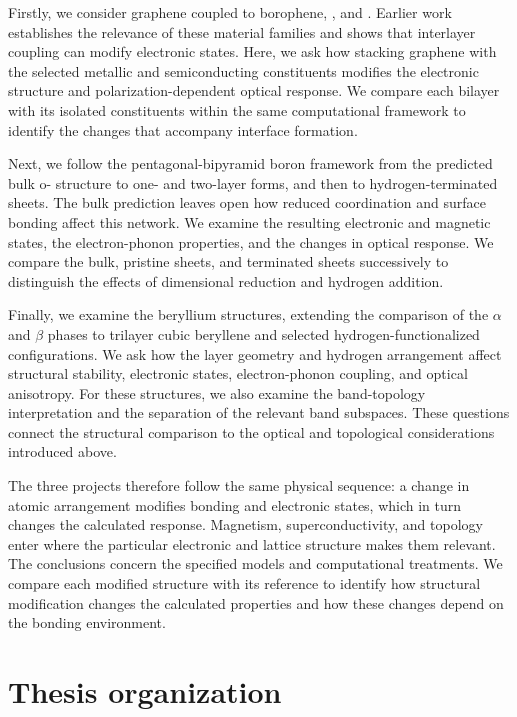 Firstly, we consider graphene coupled to borophene, , and .
Earlier work establishes the relevance of these material families and shows that interlayer coupling can modify electronic states.
Here, we ask how stacking graphene with the selected metallic and semiconducting constituents modifies the electronic structure and polarization-dependent optical response.
We compare each bilayer with its isolated constituents within the same computational framework to identify the changes that accompany interface formation.

Next, we follow the pentagonal-bipyramid boron framework from the predicted bulk o- structure to one- and two-layer forms, and then to hydrogen-terminated sheets.
The bulk prediction leaves open how reduced coordination and surface bonding affect this network.
We examine the resulting electronic and magnetic states, the electron-phonon properties, and the changes in optical response.
We compare the bulk, pristine sheets, and terminated sheets successively to distinguish the effects of dimensional reduction and hydrogen addition.

Finally, we examine the beryllium structures, extending the comparison of the $\alpha$ and $\beta$ phases to trilayer cubic beryllene and selected hydrogen-functionalized configurations.
We ask how the layer geometry and hydrogen arrangement affect structural stability, electronic states, electron-phonon coupling, and optical anisotropy.
For these structures, we also examine the band-topology interpretation and the separation of the relevant band subspaces.
These questions connect the structural comparison to the optical and topological considerations introduced above.

The three projects therefore follow the same physical sequence: a change in atomic arrangement modifies bonding and electronic states, which in turn changes the calculated response.
Magnetism, superconductivity, and topology enter where the particular electronic and lattice structure makes them relevant.
The conclusions concern the specified models and computational treatments.
We compare each modified structure with its reference to identify how structural modification changes the calculated properties and how these changes depend on the bonding environment.

\section{Thesis organization}
\label{sec:intro_organisation}

